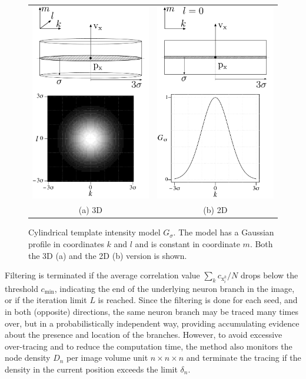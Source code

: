 \begin{figure}
	\centering
	\begin{tabular}{cc}
		\includegraphics[width=0.3\columnwidth]{fig3a} &
		\includegraphics[width=0.3\columnwidth]{fig3b} \\
		(a) 3D  & (b)  2D
	\end{tabular}
	\caption{Cylindrical template intensity model $G_{\sigma}$. The model has a Gaussian profile in coordinates $k$ and $l$ and is constant in coordinate $m$. Both the 3D (a) and the 2D (b) version is shown.}
	\label{ch4_fig3}
\end{figure}

Filtering is terminated if the average correlation value $\sum_{k} c_{\mathrm{x}_i^k}/N$ drops below the threshold $c_{\text{min}}$, indicating the end of the underlying neuron branch in the image, or if the iteration limit $L$ is reached. Since the filtering is done for each seed, and in both (opposite) directions, the same neuron branch may be traced many times over, but in a probabilistically independent way, providing accumulating evidence about the presence and location of the branches. However, to avoid excessive over-tracing and to reduce the computation time, the method also monitors the node density $D_n$ per image volume unit $n \times n \times n$ and terminate the tracing if the density in the current position exceeds the limit $\delta_n$.

